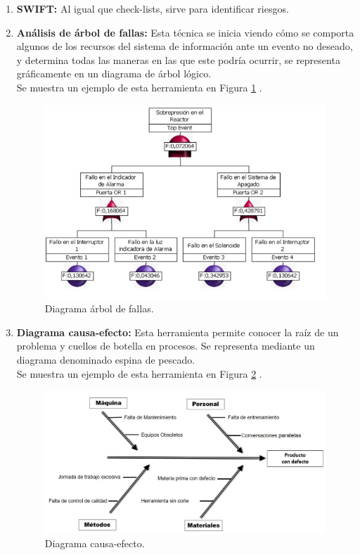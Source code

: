 \begin{enumerate}
\item {\bfseries SWIFT:}
Al igual que check-lists, sirve para identificar riesgos.
\item {\bfseries Análisis de árbol de fallas:}
Esta técnica se inicia viendo cómo se comporta algunos de los recursos del sistema de información ante un evento no deseado, y determina todas las maneras en las que este podría ocurrir, se representa gráficamente en un diagrama de árbol lógico.\\
Se muestra un ejemplo de esta herramienta en Figura \ref{img:diagrama_arbol_de_fallas} \cite{daf}.
\begin{figure}[tphb]
  		   \centering
     		   \includegraphics[width=6in]{diagrama-arbol-fallas.png}
  		   \caption{Diagrama árbol de fallas.}
  		   \label{img:diagrama_arbol_de_fallas}
\end{figure}
\item {\bfseries Diagrama causa-efecto:}
Esta herramienta permite conocer la raíz de un problema y cuellos de botella en procesos. Se representa mediante un diagrama denominado espina de pescado.\\
Se muestra un ejemplo de esta herramienta en Figura \ref{img:diagrama_causa_efecto} \cite{diagrama-pescado}.
\begin{figure}[tphb]
  		   \centering
     		   \includegraphics[width=6in]{diagrama-causa-efecto.jpg}
  		   \caption{Diagrama causa-efecto.}
  		   \label{img:diagrama_causa_efecto}
\end{figure}


\end{enumerate}
